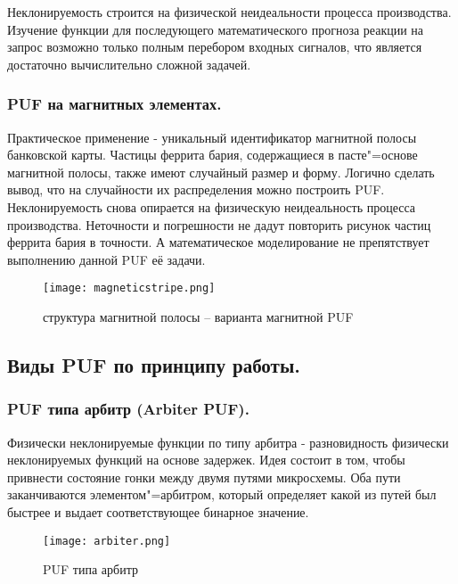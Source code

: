 \begin{enumerate}
Неклонируемость строится на физической неидеальности процесса производства. Изучение функции для последующего математического прогноза реакции на запрос возможно только полным перебором входных сигналов, что является достаточно вычислительно сложной задачей.


\subsubsection{PUF на магнитных элементах. }
\label{sub:domain:puf_physical_types:magnetic}

Практическое применение - уникальный идентификатор магнитной полосы банковской карты. Частицы феррита бария, содержащиеся в пасте"=основе магнитной полосы, также имеют случайный размер и форму. Логично сделать вывод, что на случайности их распределения можно построить PUF. Неклонируемость снова опирается на физическую неидеальность процесса производства. Неточности и погрешности не дадут повторить рисунок частиц феррита бария в  точности. А математическое моделирование не препятствует выполнению данной PUF её задачи.
\begin{figure}[ht]
    \centering
    \label{fig:domain:puf_physical_types:magnetic}
    \texttt{[image: magneticstripe.png]}
    \caption{структура магнитной полосы -- варианта магнитной PUF}
\end{figure}

\subsection{Виды PUF по принципу работы. }
\label{sub:domain:puf_types}


\subsubsection{PUF типа арбитр (Arbiter PUF). }
\label{sub:domain:puf_types:arbiter}

Физически неклонируемые функции по типу арбитра - разновидность физически неклонируемых функций на основе задержек. Идея состоит в том, чтобы привнести состояние гонки между двумя путями микросхемы. Оба пути заканчиваются элементом"=арбитром, который определяет какой из путей был быстрее и выдает соответствующее бинарное значение.
\begin{figure}[ht]
    \centering
    \texttt{[image: arbiter.png]}
    \caption{PUF типа арбитр}
    \label{fig:domain:puf_types:arbiter}
\end{figure}


\end{enumerate}

